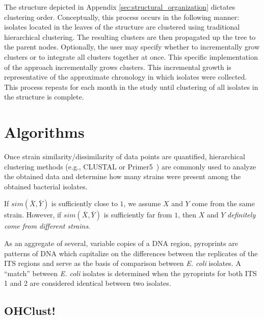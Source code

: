 \documentclass[12pt]{ucthesis}
\begin{document}
      The structure depicted in Appendix \ref{sec:structural_organization} dictates
      clustering order. Conceptually, this process occurs in the following manner:
      isolates located in the leaves of the structure are clustered using traditional
      hierarchical clustering. The resulting clusters are then propagated up the tree
      to the parent nodes. Optionally, the user may specify whether to incrementally
      grow clusters or to integrate all clusters together at once. This specific
      implementation of the approach incrementally grows clusters. This
      incremental growth is representative of the approximate chronology in which
      isolates were collected. This process repeats%
      for each month in the study until clustering of all isolates in the structure
      is complete.


\chapter{Algorithms}\label{chap:algorithm}
      Once strain similarity/dissimilarity of data points are quantified,
      hierarchical clustering methods (e.g., CLUSTAL or Primer5~\cite{Primer5:methods})
      are commonly used to analyze the obtained data and determine
      how many strains were present among the obtained bacterial isolates.
      
      If $sim(\bar{X}, \bar{Y})$ is
      sufficiently close to $1$, we assume $X$ and $Y$ come from the same strain.
      However, if $sim(\bar{X}, \bar{Y})$ is sufficiently far from $1$, then $X$ and
      $Y$ \textit{definitely come from different strains}.

      As an aggregate of several, variable copies of a DNA region, pyroprints
      are patterns of DNA which capitalize on the differences between the
      replicates of the ITS regions and serve as the basis of comparison
      between \textit{E. coli} isolates. A ``match'' between \textit{E. coli}
      isolates is determined when the pyroprints for both ITS 1 and 2 are
      considered identical between two isolates.

   \section{OHClust!}\label{sec:ohclust}
\end{document}
